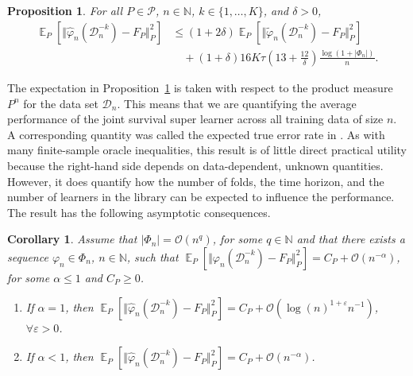 \documentclass[a4paper,danish]{article}
\DeclareMathOperator{\E}{\mathbb{E}} %
\newcommand{\N}{\mathbb{N}}
\renewcommand{\phi}{\varphi}
\renewcommand{\epsilon}{\varepsilon}
\newcommand\bigO{\ensuremath{\mathcal{O}}}
\newcommand{\1}{\mathds{1}}
\newcommand{\data}{\ensuremath{\mathcal{D}}}
\theoremstyle{plain} %
\numberwithin{theorem}{section}
\newtheorem{proposition}[theorem]{Proposition}
\newtheorem{corollary}[theorem]{Corollary}
\theoremstyle{definition} %
\theoremstyle{remark}
\begin{document}
\begin{proposition}
  \label{prop:oracle-prop}
  For all \(P\in\mathcal{P}\), \( n \in \N \), \( k \in \{1, \dots, K\} \),
  and $\delta>0$,
  \begin{align*}
    \E_{P}{\left[ \Vert \hat{\phi}_n(\data_n^{-k}) - F_P \Vert_{P}^2 \right]}
    & \leq (1 + 2\delta)
      \E_{P}{\left[ \Vert \tilde{\phi}_n(\data_n^{-k}) - F_P \Vert_{P}^2 \right]}
    \\
    & \quad
      + (1+ \delta) 16   K \tau
      \left(
      13 + \frac{12}{\delta}
      \right)
      \frac{\log(1 + |\Phi_n|)}{n}.
  \end{align*}
\end{proposition}

The expectation in Proposition~\ref{prop:oracle-prop} is
taken with respect to the product measure \( P^{n} \) for the data set
\( \data_n \). This means that we are quantifying the average
performance of the joint survival super learner across all training
data of size \(n\). A corresponding quantity was called the expected
true error rate in \cite{efron_and_tibshirani97}. As with many
finite-sample oracle inequalities, this result is of little direct
practical utility because the right-hand side depends on
data-dependent, unknown quantities. However, it does quantify how the
number of folds, the time horizon, and the number of learners in the
library can be expected to influence the performance. The result has
the following asymptotic consequences. 

\begin{corollary}
  \label{cor:asymp-cons}
  Assume that \( |\Phi_n| = \bigO(n^q)\), for some
  \( q \in \N \) and that there exists a sequence
  \( \phi_n \in \Phi_n \), \( n \in \N \), such that
  \(  \E_{P}{\left[ \Vert
      \phi_n(\data_n^{-k}) - F_P \Vert_{P}^2 \right]} = C_P +
  \bigO(n^{-\alpha}) \), for some \( \alpha\leq 1 \) and
  \( C_P \geq 0 \).
  \begin{enumerate}[label=(\alph*)]
  \item\label{item:1} If $\alpha=1$, then
    \(
    \E_{P}{\left[ \Vert
        \hat{\phi}_n(\data_n^{-k}) - F_P \Vert_{P}^2 \right]} = C_P +
    \bigO(\log(n)^{1+\epsilon}n^{-1}) \), $\forall\epsilon>0$.
  \item\label{item:2} If $\alpha<1$, then
    \(
    \E_{P}{\left[ \Vert
        \hat{\phi}_n(\data_n^{-k}) - F_P \Vert_{P}^2 \right]} = C_P +
    \bigO(n^{-\alpha}) \).
  \end{enumerate}
\end{corollary}
\end{document}
